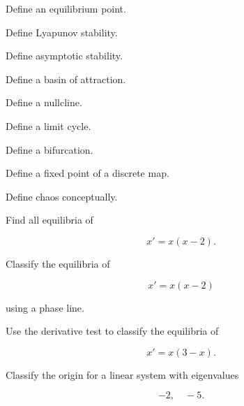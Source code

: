 \begin{exercise}[1]
Define an equilibrium point.
\end{exercise}

\begin{exercise}[1]
Define Lyapunov stability.
\end{exercise}

\begin{exercise}[1]
Define asymptotic stability.
\end{exercise}

\begin{exercise}[1]
Define a basin of attraction.
\end{exercise}

\begin{exercise}[1]
Define a nullcline.
\end{exercise}

\begin{exercise}[1]
Define a limit cycle.
\end{exercise}

\begin{exercise}[1]
Define a bifurcation.
\end{exercise}

\begin{exercise}[1]
Define a fixed point of a discrete map.
\end{exercise}

\begin{exercise}[1]
Define chaos conceptually.
\end{exercise}

\begin{exercise}[2]
Find all equilibria of

\[
x'=x(x-2).
\]
\end{exercise}

\begin{exercise}[2]
Classify the equilibria of

\[
x'=x(x-2)
\]

using a phase line.
\end{exercise}

\begin{exercise}[2]
Use the derivative test to classify the equilibria of

\[
x'=x(3-x).
\]
\end{exercise}

\begin{exercise}[2]
Classify the origin for a linear system with eigenvalues

\[
-2,
\quad
-5.
\]
\end{exercise}

